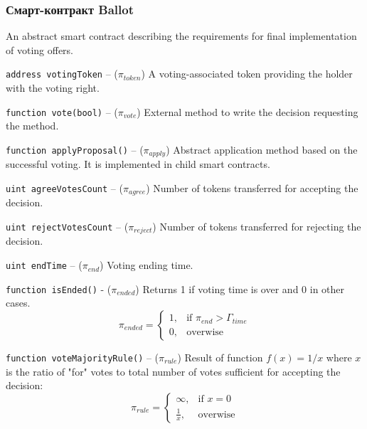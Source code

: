 \documentclass[12pt]{report}
\newcommand{\hlc}[1]{\colorbox{yellow!25}{#1}}
\def\code#1{\colorbox{light-gray}{\texttt{#1}}}
\begin{document}
\subsubsection{Смарт-контракт Ballot}
\label{tech-apps-voting-ballot}
An abstract smart contract describing the requirements for final implementation of voting offers.

\code{address votingToken} – ($\pi_{token}$)\hfill\null\linebreak
A voting-associated token providing the holder with the voting right.

\code{function vote(bool)} – ($\pi_{vote}$)\hfill\null\linebreak
External method to write the decision requesting the method.

\code{function applyProposal()} – ($\pi_{apply}$)\hfill\null\linebreak
Abstract application method based on the successful voting. It is implemented in child smart contracts.

\code{uint agreeVotesCount} – ($\pi_{agree}$)\hfill\null\linebreak
Number of tokens transferred for accepting the decision.

\code{uint rejectVotesCount} – ($\pi_{reject}$)\hfill\null\linebreak
Number of tokens transferred for rejecting the decision.

\code{uint endTime} – ($\pi_{end}$)\hfill\null\linebreak
Voting ending time.

\code{function isEnded()}  - ($\pi_{ended}$)\hfill\null\linebreak
Returns 1 if voting time is over and 0 in other cases.
\begin{equation}
\pi_{ended} = \begin{cases}
	1, & \text{if } \pi_{end} > \Gamma_{time} \\
	0, & \text{overwise}
\end{cases}
\end{equation}

\code{function voteMajorityRule()} – ($\pi_{rule}$)\hfill\null\linebreak 
\hlc{Result of function} $f(x) = 1/x$ where $x$ is the ratio of "for" votes to total number of votes sufficient for accepting the decision:
\begin{equation}
\pi_{rule} = \begin{cases}
	\infty, & \text{if } x = 0 \\
	\frac{1}{x}, & \text{overwise}
\end{cases}
\end{equation}
\end{document}
